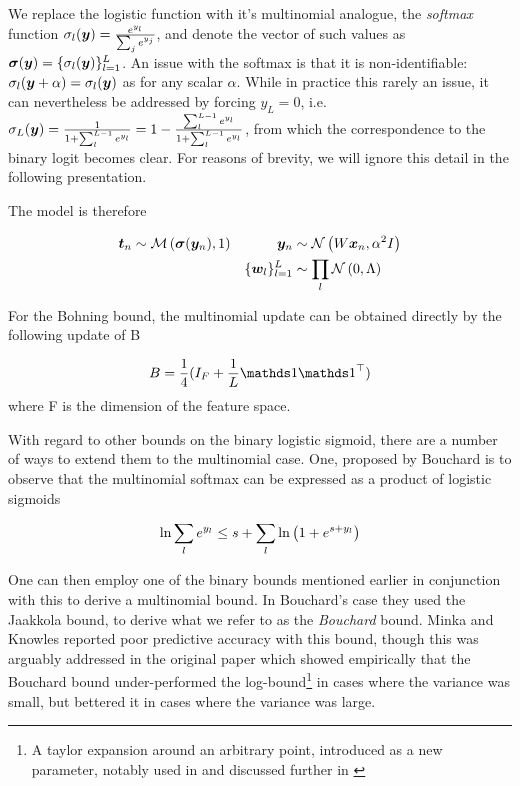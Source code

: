 We replace the logistic function with it's multinomial analogue, the \emph{softmax} function $\sigma_l(\bm y) = \frac{e^{y_l}}{\sum_j e^{y_j}}$, and denote the vector of such values as $\bm \sigma(\bm y) = \{ \sigma_l(\bm y) \}_{l=1}^{L}$. An issue with the softmax is that it is non-identifiable: $\sigma_l (\bm y + \alpha) = \sigma_l(\bm y)$ as for any scalar $\alpha$. While in practice this rarely an issue, it can nevertheless be addressed by forcing $y_L = 0$, i.e. $\sigma_L(\bm y) = \frac{1}{1 + \sum_l^{L-1} e^{y_l}} = 1 - \frac{\sum_l^{L-1} e^{y_l}}{1 + \sum_l^{L-1} e^{y_l}}$, from which the correspondence to the binary logit becomes clear. For reasons of brevity, we will ignore this detail in the following presentation.

The model is therefore

\begin{align}
\bm t_n & \sim \mathcal{M} \left( {\bm \sigma(\bm y_n)},{1} \right) & \bm y_n & \sim \mathcal{N} \left( {W \bm x_n}, {\alpha^2 I} \right) \\
 & & \{\bm w_l\}_{l = 1}^{L} & \sim \prod_l \mathcal{N} \left( {0}, {\Lambda} \right)
\end{align}

For the Bohning bound, the multinomial update can be obtained directly by the following update of B\cite{BohningLogReg1988}

\begin{equation}
B = \frac{1}{4} (I_F + \frac{1}{L}\one \one\T)
\end{equation}
where F is the dimension of the feature space.

With regard to other bounds on the binary logistic sigmoid, there are a number of ways to extend them to the multinomial case. One, proposed by Bouchard\cite{Bouchard2007} is to observe that the multinomial softmax can be expressed as a product of logistic sigmoids

\begin{equation}
\ln \sum_l e^{y_l} \leq s + \sum_l { \ln \left( 1 + e^{ s + y_l } \right) }
\end{equation}

One can then employ one of the binary bounds mentioned earlier in conjunction with this to derive a multinomial bound. In Bouchard's case they used the Jaakkola bound, to derive what we refer to as the \emph{Bouchard} bound. Minka and Knowles reported poor predictive accuracy with this bound\cite{MinkaKnowles}, though this was arguably addressed in the original paper which showed empirically that the Bouchard bound under-performed the log-bound\footnote{A taylor expansion around an arbitrary point, introduced as a new parameter, notably used in\cite{Blei2006} and discussed further in \cite{Wang2013a}} in cases where the variance was small, but bettered it in cases where the variance was large.

